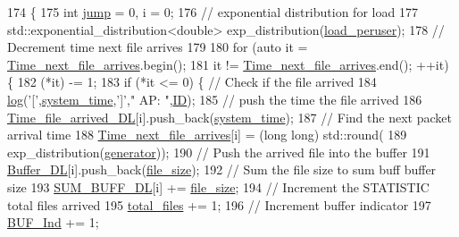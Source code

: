 \begin{DoxyCode}
174                      \{
175     \textcolor{keywordtype}{int} \hyperlink{scenenario__nAP__nSTA__ncell__multi__thread_8cpp_a17538519ca141179ae5cee37717e7843}{jump} = 0, i = 0;
176     \textcolor{comment}{// exponential distribution for load}
177     std::exponential\_distribution<double> exp\_distribution(\hyperlink{classAP_a3e8b289d2aa54fd8898e145fc605907b}{load\_peruser});
178     \textcolor{comment}{// Decrement time next file arrives}
179     
180     \textcolor{keywordflow}{for} (\textcolor{keyword}{auto} it = \hyperlink{classAP_a21b0b1203a2a7701c66b6c5a803b0160}{Time\_next\_file\_arrives}.begin();
181             it != \hyperlink{classAP_a21b0b1203a2a7701c66b6c5a803b0160}{Time\_next\_file\_arrives}.end(); ++it) \{
182         (*it) -= 1;
183         \textcolor{keywordflow}{if} (*it <= 0) \{ \textcolor{comment}{// Check if the file arrived}
184             \hyperlink{AP_8cpp_aa5af53510557e77a03906c5016ebe66f}{log}(\textcolor{charliteral}{'['},\hyperlink{AP_8cpp_aaa03a568dc1d9d3391286ea24b9cfb63}{system\_time},\textcolor{charliteral}{']'},\textcolor{stringliteral}{" AP: "},\hyperlink{classAP_a5f6f67357a37b369b8967ce354ede5dd}{ID});
185             \textcolor{comment}{// push the time the file arrived}
186             \hyperlink{classAP_a9d46a009bcda14f024fb046cd7d1e816}{Time\_file\_arrived\_DL}[i].push\_back(\hyperlink{AP_8cpp_aaa03a568dc1d9d3391286ea24b9cfb63}{system\_time});
187             \textcolor{comment}{// Find the next packet arrival time}
188             \hyperlink{classAP_a21b0b1203a2a7701c66b6c5a803b0160}{Time\_next\_file\_arrives}[i] = (\textcolor{keywordtype}{long} long) std::round(
189                     exp\_distribution(\hyperlink{classAP_adbc9c4c803b5a61b33b6199e1364fb94}{generator}));
190             \textcolor{comment}{// Push the arrived file into the buffer}
191             \hyperlink{classAP_af5970c0fdff7405ec2043c7fdd8cb427}{Buffer\_DL}[i].push\_back(\hyperlink{classAP_a6fe321d9d8cddb40d81e6c7152fae189}{file\_size});
192             \textcolor{comment}{// Sum the file size to sum buff buffer size}
193             \hyperlink{classAP_aaff6ce72b09dc955c0aaff3dc9fa0f04}{SUM\_BUFF\_DL}[i] += \hyperlink{classAP_a6fe321d9d8cddb40d81e6c7152fae189}{file\_size};
194             \textcolor{comment}{// Increment the STATISTIC total files arrived }
195             \hyperlink{classAP_aac5ade30eaf4b86c9b32ff7d37974a55}{total\_files} += 1;
196             \textcolor{comment}{// Increment buffer indicator}
197             \hyperlink{classAP_a6a9694207e9646b4a1c95b54725fcd3b}{BUF\_Ind} += 1;

\end{DoxyCode}
